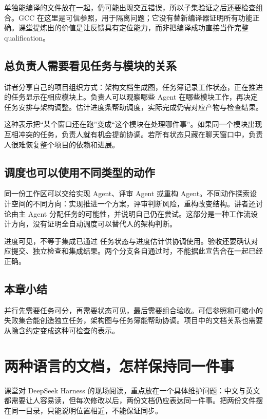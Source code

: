 \documentclass[a4paper]{article}
\begin{document}
单独能编译的文件放在一起，仍可能出现交互错误，所以子集验证之后还要检查组合。GCC 在这里是可信参照，用于隔离问题；它没有替新编译器证明所有功能正确。课堂提炼出的价值是让反馈具有定位能力，而非把编译成功直接当作完整 qualification。

\subsection{总负责人需要看见任务与模块的关系}
讲者分享自己的项目组织方式：架构文档生成图，任务簿记录工作状态，正在推进的任务显示在相应模块上。负责人可以观察哪些 Agent 在哪些模块工作，再决定任务安排与架构调整。估计进度条帮助调度，实际完成仍需对应产物与检查结果。

这种表示把“某个窗口还在跑”变成“这个模块在处理哪件事”。如果同一个模块出现互相冲突的任务，负责人就有机会提前协调。若所有状态只藏在聊天窗口中，负责人很难恢复整个项目的依赖和进展。

\subsection{调度也可以使用不同类型的动作}
同一份工作区可以交给实现 Agent、评审 Agent 或重构 Agent。不同动作探索设计空间的不同方向：实现推进一个方案，评审判断风险，重构改变结构。讲者还讨论由主 Agent 分配任务的可能性，并说明自己仍在尝试。这部分是一种工作流设计方向，没有证明全自动调度可以替代人的架构判断。

\begin{warningbox}{进度可见，不等于集成已通过}
任务状态与进度估计供协调使用。验收还要确认对应提交、独立检查和集成结果。两个分支各自通过时，不能据此宣告合在一起已经正确。
\end{warningbox}

\subsection{本章小结}
并行先需要任务可分，再需要状态可见，最后需要组合验收。可信参照和可缩小的失败集合能创造独立任务，架构图与任务簿能帮助协调。项目中的文档关系也需要从隐含约定变成这种可检查的表示。

\section{两种语言的文档，怎样保持同一件事}
\label{sec:bilingual}
课堂对 DeepSeek Harness 的现场阅读，重点放在一个具体维护问题：中文与英文都需要让人容易读，但每次修改以后，两份文档仍应表达同一件事。把两份文件摆在同一目录，只能说明位置相近，不能保证同步。
\end{document}
